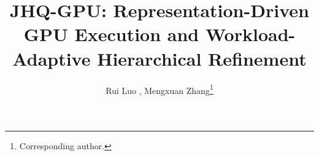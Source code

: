 \documentclass[runningheads]{llncs}
\begin{document}
\title{JHQ-GPU: Representation-Driven GPU Execution and
       Workload-Adaptive Hierarchical Refinement}
\author{Rui Luo ,  Mengxuan Zhang\thanks{Corresponding author.}}
\maketitle
\end{document}
